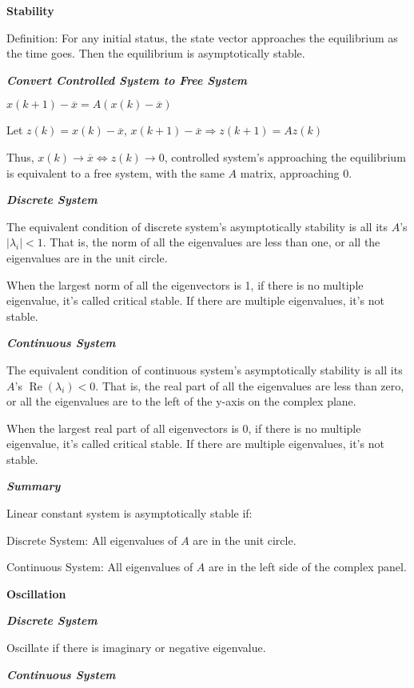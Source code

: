 \documentclass{article}
\newcommand{\bigtitle}[1]{
	\noindent
	\textbf{#1}
}
\newcommand{\smalltitle}[1]{
	\noindent
	\textbf{\textit{#1}}
}
\begin{document}
\begin{spacing}{1.2}
\bigtitle{Stability}

Definition: For any initial status, the state vector approaches the equilibrium as the time goes. Then the equilibrium is asymptotically stable.

\smalltitle{Convert Controlled System to Free System}

$x(k+1) - \overline{x} = A(x(k) - \overline{x})$

Let $z(k) = x(k) - \overline{x}$, $x(k+1)-\overline{x} \Rightarrow z(k+1) = Az(k)$

Thus, $x(k) \rightarrow \overline{x} \Leftrightarrow z(k) \rightarrow 0$, controlled system's approaching the equilibrium is equivalent to a free system, with the same $A$ matrix, approaching 0.

\smalltitle{Discrete System}

The equivalent condition of discrete system's asymptotically stability is all its $A$'s $|\lambda_i| < 1$. That is, the norm of all the eigenvalues are less than one, or all the eigenvalues are in the unit circle.

When the largest norm of all the eigenvectors is 1, if there is no multiple eigenvalue, it's called critical stable. If there are multiple eigenvalues, it's not stable.

\smalltitle{Continuous System}

The equivalent condition of continuous system's asymptotically stability is all its $A$'s $\operatorname{Re}(\lambda_i) < 0$. That is, the real part of all the eigenvalues are less than zero, or all the eigenvalues are to the left of the y-axis on the complex plane.

When the largest real part of all eigenvectors is 0, if there is no multiple eigenvalue, it's called critical stable. If there are multiple eigenvalues, it's not stable.

\smalltitle{Summary}

Linear constant system is asymptotically stable if:

Discrete System: All eigenvalues of $A$ are in the unit circle.

Continuous System: All eigenvalues of $A$ are in the left side of the complex panel.

\bigtitle{Oscillation}

\smalltitle{Discrete System}

Oscillate if there is imaginary or negative eigenvalue.

\smalltitle{Continuous System}


\end{spacing}
\end{document}
